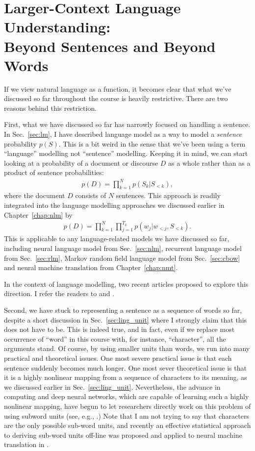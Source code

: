 \documentclass{report}
\begin{document}
\section{Larger-Context Language Understanding: \\
    Beyond Sentences and Beyond Words}

If we view natural language as a function, it becomes clear that what we've
discussed so far throughout the course is heavily restrictive. There are two
reasons behind this restriction. 

First, what we have discussed so far has narrowly focused on handling a
sentence. In Sec.~\ref{sec:lm}, I have described language model as a way to
model a {\em sentence} probability $p(S)$. This is a bit weird in the sense that
we've been using a term ``language'' modelling not ``sentence'' modelling.
Keeping it in mind, we can start looking at a probability of a document or
discourse $D$ as a whole rather than as a product of sentence probabilities:
\begin{align*}
    p(D) = \prod_{k=1}^N p(S_k | S_{<k}),
\end{align*}
where the document $D$ consists of $N$ sentences. This approach is readily
integrated into the language modelling approaches we discussed earlier in
Chapter~\ref{chap:nlm} by
\begin{align*}
    p(D) = \prod_{k=1}^N \prod_{j=1}^{T_k} p(w_j | w_{<j}, S_{<k}).
\end{align*}
This is applicable to any language-related models we have discussed so far,
including neural language model from Sec.~\ref{sec:nlm}, recurrent language
model from Sec.~\ref{sec:rlm}, Markov random
field language model from Sec.~\ref{sec:cbow} and neural machine translation
from Chapter~\ref{chap:nmt}.

In the context of language modelling, two recent articles proposed to explore
this direction. I refer the readers to \cite{wang2015larger} and
\cite{ji2015document}.

Second, we have stuck to representing a sentence as a sequence of words so far,
despite a short discussion in Sec.~\ref{sec:ling_unit} where I strongly claim
that this does not have to be. This is indeed true, and in fact, even if we
replace most occurrence of ``word'' in this course with, for instance,
``character'', all the arguments stand. Of course, by using smaller units than
words, we run into many practical and theoretical issues. One most severe
practical issue is that each sentence suddenly becomes much longer. One most
sever theoretical issue is that it is a highly nonlinear mapping from a sequence
of characters to its meaning, as we discussed earlier in
Sec.~\ref{sec:ling_unit}. Nevertheless, the advance in computing and deep neural
networks, which are capable of learning such a highly nonlinear mapping, have
begun to let researchers directly work on this problem of using subword units
(see, e.g., \cite{kim2015character,ling2015character}.) Note that I am not
trying to say that characters are the only possible sub-word units, and recently
an effective statistical approach to deriving sub-word units off-line was
proposed and applied to neural machine translation in \cite{sennrich2015neural}.
\end{document}
